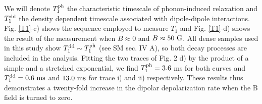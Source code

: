 \documentclass[preprintnumbers,amsmath,amssymb,superscriptaddress,twocolumn,showpacs]{revtex4-2}
\begin{document}
We will denote $T_1^{\rm ph}$ the characteristic timescale of phonon-induced relaxation and $T_1^{\rm dd}$ the density dependent timescale associated with dipole-dipole  interactions.
Fig. \ref{T1}-c) shows the sequence employed to measure $T_1$ and Fig. \ref{T1}-d) shows the result of the measurement when $B\approx 0$ and $B \approx 50\ \rm G$.
All dense samples used in this study show $T_1^{\rm dd} \sim T_1^{\rm ph}$ (see SM sec. IV A), so both decay processes are included in the analysis. Fitting the two traces of Fig. 2 d) by the product of a simple and a stretched exponential, we find $T_1^{\rm ph}=3.6$ ms for both curves and $T_1^{\rm dd}= 0.6\ \rm ms$ and $13.0\ \rm ms$ for trace i) and ii) respectively. These results thus demonstrates a twenty-fold increase in the dipolar depolarization rate when the B field is turned to zero.
\end{document}
